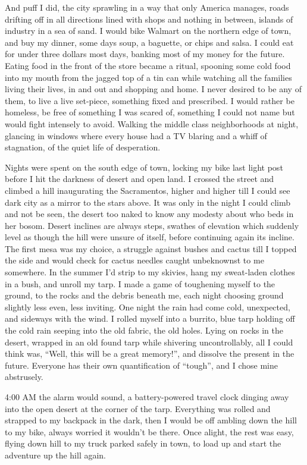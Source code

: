 \documentclass[ebook, 10pt, openright, onecolumn]{memoir}
\begin{document}
And puff I did, the city sprawling in a way that only America manages, roads
drifting off in all directions lined with shops and nothing in between, islands
of industry in a sea of sand.  I would bike Walmart on the northern edge of
town, and buy my dinner, some days soup, a baguette, or chips and salsa.  I
could eat for under three dollars most days, banking most of my money for the
future.  Eating food in the front of the store became a ritual, spooning some
cold food into my mouth from the jagged top of a tin can while watching all the
families living their lives, in and out and shopping and home.  I never desired
to be any of them, to live a live set-piece, something fixed and prescribed.  I
would rather be homeless, be free of something I was scared of, something I
could not name but would fight intensely to avoid.  Walking the middle class
neighborhoods at night, glancing in windows where every house had a TV blaring
and a whiff of stagnation, of the quiet life of desperation.  

Nights were spent on the south edge of town, locking my bike last light post
before I hit the darkness of desert and open land.  I crossed the street and
climbed a hill inaugurating the Sacramentos, higher and higher till I could see
dark city as a mirror to the stars above.  It was only in the night I could
climb and not be seen, the desert too naked to know any modesty about who beds
in her bosom.  Desert inclines are always steps, swathes of elevation which
suddenly level as though the hill were unsure of itself, before continuing again
its incline.  The first mesa was my choice, a struggle against bushes and cactus
till I topped the side and would check for cactus needles caught unbeknownst to
me somewhere.  In the summer I'd strip to my skivies, hang my sweat-laden
clothes in a bush, and unroll my tarp.  I made a game of toughening myself to
the ground, to the rocks and the debris beneath me, each night choosing ground
slightly less even, less inviting.  One night the rain had come cold,
unexpected, and sideways with the wind.  I rolled myself into a burrito, blue
tarp holding off the cold rain seeping into the old fabric, the old holes.
Lying on rocks in the desert, wrapped in an old found tarp while shivering
uncontrollably, all I could think was, ``Well, this will be a great memory!'',
and dissolve the present in the future.  Everyone has their own quantification
of ``tough'', and I chose mine abstrusely.

4:00 AM the alarm would sound, a battery-powered travel clock dinging away into
the open desert at the corner of the tarp.  Everything was rolled and strapped
to my backpack in the dark, then I would be off ambling down the hill to my
bike, always worried it wouldn't be there.  Once alight, the rest was easy,
flying down hill to my truck parked safely in town, to load up and start the
adventure up the hill again.
\end{document}
